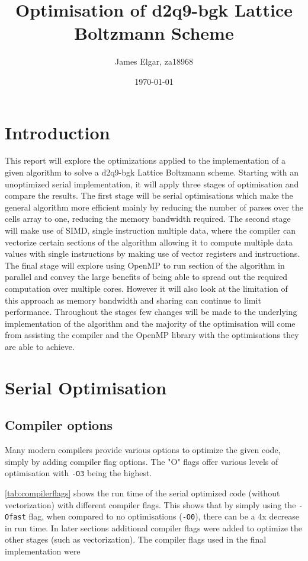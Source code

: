\documentclass{article}
\title{Optimisation of d2q9-bgk Lattice Boltzmann Scheme}
\author{James Elgar, za18968}
\date{\today}
\begin{document}
\begin{multicols}{2}

\maketitle

\section{Introduction}

This report will explore the optimizations applied to the implementation of
a given algorithm to solve a d2q9-bgk Lattice Boltzmann scheme.  Starting with
an unoptimized serial implementation, it will apply three stages of optimisation
and compare the results. The first stage will be serial optimisations which
make the general algorithm more efficient mainly by reducing the number of
parses over the cells array to one, reducing the memory bandwidth required. The
second stage will make use of SIMD, single instruction multiple data, where the
compiler can vectorize certain sections of the algorithm allowing it to compute
multiple data values with single instructions by making use of vector registers
and instructions. The final stage will explore using OpenMP to run section of
the algorithm in parallel and convey the large benefits of being able to spread
out the required computation over multiple cores. However it will also look at
the limitation of this approach as memory bandwidth and sharing can continue to
limit performance. Throughout the stages few changes will be made to the
underlying implementation of the algorithm and the majority of the optimisation
will come from assisting the compiler and the OpenMP library with the
optimisations they are able to achieve.

\section{Serial Optimisation}

\subsection{Compiler options}

Many modern compilers provide various options to optimize the given code,
simply by adding compiler flag options. The "O" flags offer various levels of
optimisation with \verb|-O3| being the highest.

\autoref{tab:compilerflags} shows the run time of the serial optimized code
(without vectorization) with different compiler flags. This shows that by
simply using the \verb|-Ofast| flag, when compared to no optimisations
(\verb|-O0|), there can be a 4x decrease in run time. In later sections
additional compiler flags were added to optimize the other stages (such as
vectorization). The compiler flags used in the final implementation were 


\end{multicols}
\end{document}

